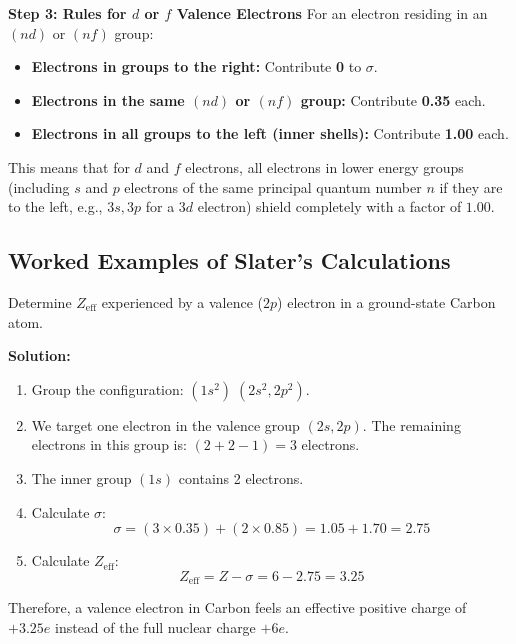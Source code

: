 \documentclass[12pt,a4paper]{article}
\begin{document}
\textbf{Step 3: Rules for $d$ or $f$ Valence Electrons}
For an electron residing in an $(nd)$ or $(nf)$ group:
\begin{itemize}[leftmargin=*, itemsep=2pt]
  \item \textbf{Electrons in groups to the right:} Contribute \textbf{0} to $\sigma$.
  \item \textbf{Electrons in the same $(nd)$ or $(nf)$ group:} Contribute \textbf{0.35} each.
  \item \textbf{Electrons in all groups to the left (inner shells):} Contribute \textbf{1.00} each.
\end{itemize}
This means that for $d$ and $f$ electrons, all electrons in lower energy groups (including $s$ and $p$ electrons of the same principal quantum number $n$ if they are to the left, e.g., $3s, 3p$ for a $3d$ electron) shield completely with a factor of $1.00$.

\subsection{Worked Examples of Slater's Calculations}

\begin{tcolorbox}[examplebox, title={Example 1.1: Calculation for Carbon ($C$, $Z=6$)}]
  Determine $Z_{\text{eff}}$ experienced by a valence ($2p$) electron in a ground-state Carbon atom.
  \par\vspace{4pt}
  \textbf{Solution:}
  \begin{enumerate}
    \item Group the configuration: $(1s^2) \; (2s^2, 2p^2)$.
    \item We target one electron in the valence group $(2s, 2p)$. The remaining electrons in this group is: $(2 + 2 - 1) = 3$ electrons.
    \item The inner group $(1s)$ contains 2 electrons.
    \item Calculate $\sigma$:
      \[ \sigma = (3 \times 0.35) + (2 \times 0.85) = 1.05 + 1.70 = 2.75 \]
    \item Calculate $Z_{\text{eff}}$:
      \[ Z_{\text{eff}} = Z - \sigma = 6 - 2.75 = 3.25 \]
  \end{enumerate}
  Therefore, a valence electron in Carbon feels an effective positive charge of $+3.25e$ instead of the full nuclear charge $+6e$.
\end{tcolorbox}
\end{document}
